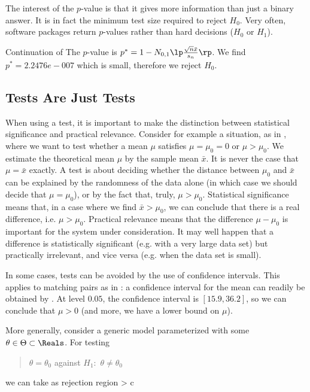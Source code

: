 The interest of the $p$-value is that it gives more information
than just a binary answer. It is in fact the minimum test size
required to reject $H_0$. Very often, software packages return
$p$-values rather than hard decisions ($H_0$ or $H_1$).


 \begin{exnn}{Continuation of }The $p$-value is
$ p^*=
 1-N_{0,1}\lp \frac{\sqrt{n}\bar{x}}{ s_n}\rp
$. We find $p^*= 2.2476e-007$ which is small, therefore we
reject $H_0$.
 \end{exnn}




\subsection{Tests Are Just Tests}
\label{sec-tajt} When using a test, it is important to make the
distinction between statistical significance and practical
relevance. Consider for example a situation, as in
, where we want to test whether a mean
$\mu$  satisfies $\mu=\mu_0 = 0$ or $\mu>\mu_0$. We estimate
the theoretical mean $\mu$ by the sample mean $\bar{x}$. It is
never the case that $\mu=\bar{x}$ exactly. A test is about
deciding whether the distance between $\mu_0$ and $\bar{x}$ can
be explained by the randomness of the data alone (in which case
we should decide that $\mu=\mu_0$), or by the fact that, truly,
$\mu>\mu_0$. Statistical significance means that, in a case
where we find $\bar{x}
> \mu_0$, we can conclude that there is a real difference, i.e.
$\mu>\mu_0$. Practical relevance means that the difference
$\mu- \mu_0$ is important for the system under consideration.
It may well happen that a difference is statistically
significant (e.g. with a very large data set) but practically
irrelevant, and vice versa (e.g. when the data set is small).

In some cases, tests can be avoided by the use of confidence
intervals. This applies to matching pairs as in
: a confidence interval for the mean can
readily be obtained by . At level $0.05$,
the confidence interval is $[15.9, 36.2]$, so we can conclude
that $\mu>0$ (and more, we have a lower bound on $\mu$).


More generally, consider a generic model parameterized with
some $\theta\in \Theta\subset \Reals$. For testing
\begin{quote}
$\theta=\theta_0$ against $H_1$:~$\theta\neq \theta_0$
\end{quote}
we can take as rejection region
 \ben {}> c\een

